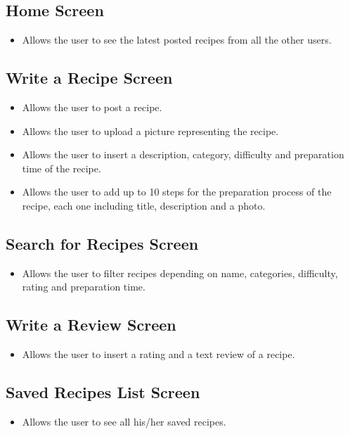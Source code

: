 	\subsection{Home Screen}
		\begin{itemize}
			\item Allows the user to see the latest posted recipes from all the other users.
			
		\end{itemize}

	\subsection{Write a Recipe Screen}
		\begin{itemize}
			\item Allows the user to post a recipe.
			
			\item Allows the user to upload a picture representing the recipe.
			
			\item Allows the user to insert a description, category, difficulty and preparation time of the recipe.
			
			\item Allows the user to add up to 10 steps for the preparation process of the recipe, each one including title, description and a photo.
		\end{itemize}

	\subsection{Search for Recipes Screen}
		\begin{itemize}
			\item Allows the user to filter recipes depending on name, categories, difficulty, rating and preparation time.
		\end{itemize}

	\subsection{Write a Review Screen}
		\begin{itemize}
			\item Allows the user to insert a rating and a text review of a recipe.
		\end{itemize}

	\subsection{Saved Recipes List Screen}
		\begin{itemize}
			\item Allows the user to see all his/her saved recipes.
		\end{itemize}

